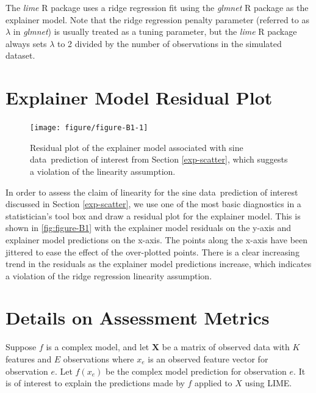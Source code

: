 \documentclass[AMS,STIX2COL]{WileyNJD-v2}\usepackage[]{graphicx}\usepackage[]{color}
\newenvironment{knitrout}{}{} %
\newcommand{\data}{sine data}
\begin{document}
The \emph{lime} R package uses a ridge regression fit using the \emph{glmnet} R package \citep{simon:2011} as the explainer model. Note that the ridge regression penalty parameter (referred to as $\lambda$ in \emph{glmnet}) is usually treated as a tuning parameter, but the \emph{lime} R package always sets $\lambda$ to 2 divided by the number of observations in the simulated dataset.

\section{Explainer Model Residual Plot} \label{residual-plot}
\begin{figure}[!h]
\begin{knitrout}
\color{fgcolor}

{\centering \texttt{[image: figure/figure-B1-1]} 

}



\end{knitrout}
\caption{Residual plot of the explainer model associated with \data \ prediction of interest from Section \ref{exp-scatter}, which suggests a violation of the linearity assumption.}
\label{fig:figure-B1}
\end{figure}

In order to assess the claim of linearity for the \data \ prediction of interest discussed in Section \ref{exp-scatter}, we use one of the most basic diagnostics in a statistician's tool box and draw a residual plot for the explainer model. This is shown in \autoref{fig:figure-B1} with the explainer model residuals on the y-axis and explainer model predictions on the x-axis. The points along the x-axis have been jittered to ease the effect of the over-plotted points. There is a clear increasing trend in the residuals as the explainer model predictions increase, which indicates a violation of the ridge regression linearity assumption.

\section{Details on Assessment Metrics} \label{metric-details}

Suppose $f$ is a complex model, and let $\textbf{X}$ be a matrix of observed data with $K$ features and $E$ observations where $x_e$ is an observed feature vector for observation $e$. Let $f(x_e)$ be the complex model prediction for observation $e$. It is of interest to explain the predictions made by $f$ applied to $X$ using LIME. 
\end{document}
